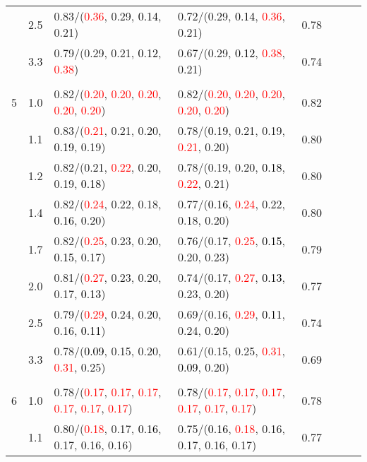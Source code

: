 \documentclass[10pt,a4paper]{report}
\begin{document}
\begin{table}[!htbp]
\begin{center}
{\begin{tabular}{ccllcccc}
			&2.5&0.83/(\textcolor{red}{0.36}, 0.29, \textcolor{black}{0.14}, 0.21)&0.72/(0.29, \textcolor{black}{0.14}, \textcolor{red}{0.36}, 0.21)&0.78\\
			&3.3&0.79/(0.29, 0.21, \textcolor{black}{0.12}, \textcolor{red}{0.38})&0.67/(0.29, \textcolor{black}{0.12}, \textcolor{red}{0.38}, 0.21)&0.74\\
			&&&&\\
			5			&1.0&0.82/(\textcolor{red}{0.20}, \textcolor{red}{0.20}, \textcolor{red}{0.20}, \textcolor{red}{0.20}, \textcolor{red}{0.20})&0.82/(\textcolor{red}{0.20}, \textcolor{red}{0.20}, \textcolor{red}{0.20}, \textcolor{red}{0.20}, \textcolor{red}{0.20})&0.82\\
			&1.1&0.83/(\textcolor{red}{0.21}, 0.21, 0.20, \textcolor{black}{0.19}, 0.19)&0.78/(\textcolor{black}{0.19}, 0.21, 0.19, \textcolor{red}{0.21}, 0.20)&0.80\\
			&1.2&0.82/(0.21, \textcolor{red}{0.22}, 0.20, 0.19, \textcolor{black}{0.18})&0.78/(0.19, 0.20, \textcolor{black}{0.18}, \textcolor{red}{0.22}, 0.21)&0.80\\
			&1.4&0.82/(\textcolor{red}{0.24}, 0.22, 0.18, \textcolor{black}{0.16}, 0.20)&0.77/(\textcolor{black}{0.16}, \textcolor{red}{0.24}, 0.22, 0.18, 0.20)&0.80\\
			&1.7&0.82/(\textcolor{red}{0.25}, 0.23, 0.20, \textcolor{black}{0.15}, 0.17)&0.76/(0.17, \textcolor{red}{0.25}, \textcolor{black}{0.15}, 0.20, 0.23)&0.79\\
			&2.0&0.81/(\textcolor{red}{0.27}, 0.23, 0.20, 0.17, \textcolor{black}{0.13})&0.74/(0.17, \textcolor{red}{0.27}, \textcolor{black}{0.13}, 0.23, 0.20)&0.77\\
			&2.5&0.79/(\textcolor{red}{0.29}, 0.24, 0.20, 0.16, \textcolor{black}{0.11})&0.69/(0.16, \textcolor{red}{0.29}, \textcolor{black}{0.11}, 0.24, 0.20)&0.74\\
			&3.3&0.78/(\textcolor{black}{0.09}, 0.15, 0.20, \textcolor{red}{0.31}, 0.25)&0.61/(0.15, 0.25, \textcolor{red}{0.31}, \textcolor{black}{0.09}, 0.20)&0.69\\
			&&&&\\
			6			&1.0&0.78/(\textcolor{red}{0.17}, \textcolor{red}{0.17}, \textcolor{red}{0.17}, \textcolor{red}{0.17}, \textcolor{red}{0.17}, \textcolor{red}{0.17})&0.78/(\textcolor{red}{0.17}, \textcolor{red}{0.17}, \textcolor{red}{0.17}, \textcolor{red}{0.17}, \textcolor{red}{0.17}, \textcolor{red}{0.17})&0.78\\
			&1.1&0.80/(\textcolor{red}{0.18}, 0.17, \textcolor{black}{0.16}, 0.17, 0.16, 0.16)&0.75/(\textcolor{black}{0.16}, \textcolor{red}{0.18}, 0.16, 0.17, 0.16, 0.17)&0.77\\

\end{tabular}}
\end{center}
\end{table}
\end{document}
